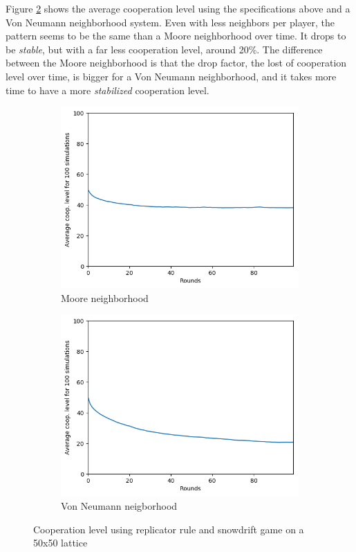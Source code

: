 \documentclass[letterpaper]{article}
\begin{document}
Figure \ref{fig:50vonpart2} shows the average cooperation level using
the specifications above and a Von Neumann neighborhood system. Even
with less neighbors per player, the pattern seems to be the same
than a Moore neighborhood over time.
It drops to be \textit{stable},
but with a far less cooperation level, around 20\%.
The difference between the Moore neighborhood is that the drop factor,
the lost of cooperation level over time, is bigger for a Von Neumann
neighborhood, and it takes more time to have a more \textit{stabilized}
cooperation level.

\begin{figure}[H]
    \begin{subfigure}{.5\textwidth}
        \centering
        \includegraphics[width=1\linewidth]{images/assign2/50-part2}
        \caption{Moore neighborhood}
        \label{fig:50moorepart2}
    \end{subfigure}
    \begin{subfigure}{.5\textwidth}
        \centering
        \includegraphics[width=1\linewidth]{images/assign2/50_vonneumann-part2}
        \caption{Von Neumann neigborhood}
        \label{fig:50vonpart2}
    \end{subfigure}
    \caption{Cooperation level using replicator rule and
    snowdrift game on a 50x50 lattice}
    \label{fig:50part2}
\end{figure}
\end{document}
